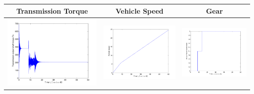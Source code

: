 \documentclass{seminar}
\begin{document}
\begin{slide}
\begin{tabular}{ccc}
Transmission Torque & Vehicle Speed & Gear
\\ \hline
\includegraphics[angle=0,scale=0.22]{Ts-tps10-grade0} &
\includegraphics[angle=0,scale=0.22]{V-tps10-grade0} &
\includegraphics[angle=0,scale=0.22]{Gear-tps10-grade0} 
\end{tabular}


\end{slide}
\end{document}
